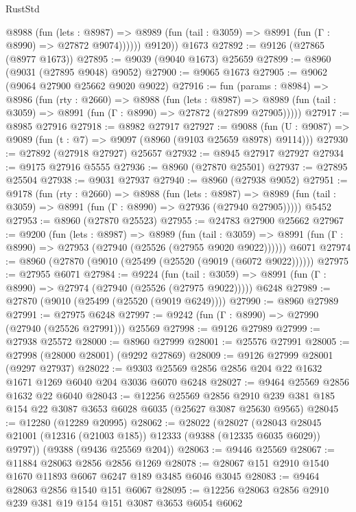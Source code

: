 \begin{lexlean}{RustStd}
\begin{coremodule}
            @8988
              (fun (lets : @8987) =>
              @8989 (fun (tail : @3059) => @8991 (fun (Γ : @8990) => @27872 @9074))))))
        @9120))
    @1673
@27892 := @9126 (@27865 (@8977 @1673))
@27895 := @9039 (@9040 @1673) @25659
@27899 := @8960 (@9031 (@27895 @9048) @9052)
@27900 := @9065 @1673
@27905 := @9062 (@9064 @27900 @25662 @9020 @9022)
@27916 := fun (params : @8984) =>
  @8986
    (fun (rty : @2660) =>
    @8988
      (fun (lets : @8987) =>
      @8989 (fun (tail : @3059) => @8991 (fun (Γ : @8990) => @27872 (@27899 @27905)))))
@27917 := @8985 @27916
@27918 := @8982 @27917
@27927 := @9088
    (fun (U : @9087) => @9089 (fun (t : @7) => @9097 (@8960 (@9103 @25659 @8978) @9114)))
@27930 := @27892 (@27918 @27927) @25657
@27932 := @8945 @27917 @27927
@27934 := @9175 @27916 @5555
@27936 := @8960 (@27870 @25501)
@27937 := @27895 @25504
@27938 := @9031 @27937
@27940 := @8960 (@27938 @9052)
@27951 := @9178
    (fun (rty : @2660) =>
    @8988
      (fun (lets : @8987) =>
      @8989 (fun (tail : @3059) => @8991 (fun (Γ : @8990) => @27936 (@27940 @27905)))))
    @5452
@27953 := @8960 (@27870 @25523)
@27955 := @24783 @27900 @25662
@27967 := @9200
    (fun (lets : @8987) =>
    @8989
      (fun (tail : @3059) =>
      @8991 (fun (Γ : @8990) => @27953 (@27940 (@25526 (@27955 @9020 @9022))))))
    @6071
@27974 := @8960 (@27870 (@9010 (@25499 (@25520 (@9019 (@6072 @9022))))))
@27975 := @27955 @6071
@27984 := @9224
    (fun (tail : @3059) => @8991 (fun (Γ : @8990) => @27974 (@27940 (@25526 (@27975 @9022)))))
    @6248
@27989 := @27870 (@9010 (@25499 (@25520 (@9019 @6249))))
@27990 := @8960 @27989
@27991 := @27975 @6248
@27997 := @9242 (fun (Γ : @8990) => @27990 (@27940 (@25526 @27991))) @25569
@27998 := @9126 @27989
@27999 := @27938 @25572
@28000 := @8960 @27999
@28001 := @25576 @27991
@28005 := @27998 (@28000 @28001) (@9292 @27869)
@28009 := @9126 @27999 @28001 (@9297 @27937)
@28022 := @9303 @25569 @2856 @2856 @204 @22 @1632 @1671 @1269 @6040 @204 @3036 @6070 @6248
@28027 := @9464 @25569 @2856 @1632 @22 @6040
@28043 := @12256
    @25569
    @2856
    @2910
    @239
    @381
    @185
    @154
    @22
    @3087
    @3653
    @6028
    @6035
    (@25627 @3087 @25630 @9565)
@28045 := @12280 (@12289 @20995)
@28062 := @28022
    (@28027 (@28043 @28045 @21001 (@12316 (@21003 @185)) @12333 (@9388 (@12335 @6035 @6029)) @9797))
    (@9388 (@9436 @25569 @204))
@28063 := @9446 @25569
@28067 := @11884 @28063 @2856 @2856 @1269
@28078 := @28067 @151 @2910 @1540 @1670 @11893 @6067 @6247 @189 @3485 @6046 @3045
@28083 := @9464 @28063 @2856 @1540 @151 @6067
@28095 := @12256 @28063 @2856 @2910 @239 @381 @19 @154 @151 @3087 @3653 @6054 @6062

\end{coremodule}
\end{lexlean}
